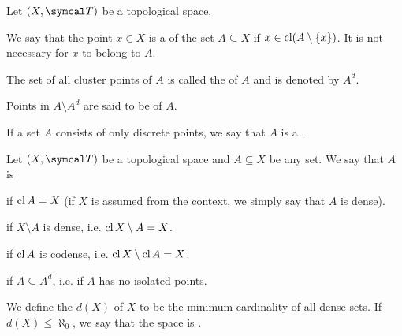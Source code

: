 \begin{definition}\label{def:topologically_derived_set}\cite[24]{Engelking1989}
  Let \( (X, \Cal{T}) \) be a topological space.

  \begin{defenum}
     We say that the point \( x \in X \) is a  of the set \( A \subseteq X \) if \( x \in \operatorname{cl}(A \setminus \{ x \}) \). It is not necessary for \( x \) to belong to \( A \).

     The set of all cluster points of \( A \) is called the  of \( A \) and is denoted by \( A^d \).

     Points in \( A \setminus A^d \) are said to be  of \( A \).

     If a set \( A \) consists of only discrete points, we say that \( A \) is a .
  \end{defenum}
\end{definition}

\begin{definition}\label{def:topologically_dense_set}\cite[25]{Engelking1989}
  Let \( (X, \Cal{T}) \) be a topological space and \( A \subseteq X \) be any set. We say that \( A \) is

  \begin{defenum}
      if \( \operatorname{cl}{A} = X \) (if \( X \) is assumed from the context, we simply say that \( A \) is dense).

      if \( X \setminus A \) is dense, i.e. \( \operatorname{cl}{X \setminus A} = X \).

      if \( \operatorname{cl}{A} \) is codense, i.e. \( \operatorname{cl}{X \setminus \operatorname{cl}{A}} = X \).

      if \( A \subseteq A^d \), i.e. if \( A \) has no isolated points.
  \end{defenum}

  We define the  \( d(X) \) of \( X \) to be the minimum cardinality of all dense sets. If \( d(X) \leq \aleph_0 \), we say that the space is .
\end{definition}
